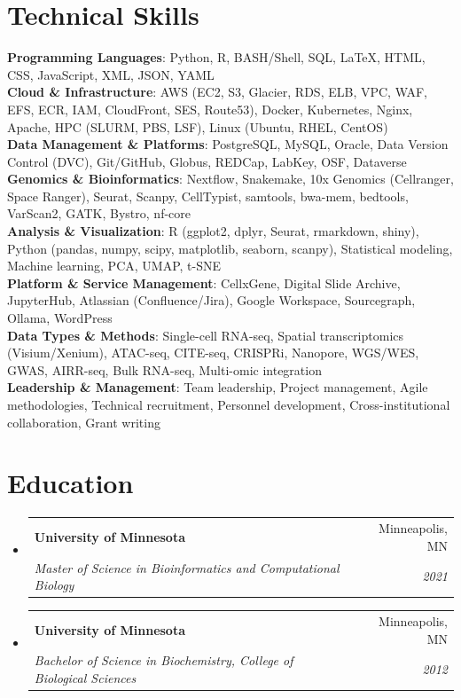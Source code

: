 \documentclass[letterpaper,11pt]{article}
\makeatletter
\newcommand{\resumeSubheading}[4]{
  \vspace{-2pt}\item
    \begin{tabular*}{0.97\textwidth}[t]{l@{\extracolsep{\fill}}r}
      \textbf{#1} & #2 \\
      \textit{\small#3} & \textit{\small #4} \\
    \end{tabular*}\vspace{-7pt}
}
\newcommand{\resumeSubHeadingListStart}{\begin{itemize}[leftmargin=0.15in, label={}]}
\newcommand{\resumeSubHeadingListEnd}{\end{itemize}}
\makeatother
\begin{document}
\section{Technical Skills}
 \begin{itemize}[leftmargin=0.15in, label={}]
    \small{\item{
     \textbf{Programming Languages}{: Python, R, BASH/Shell, SQL, LaTeX, HTML, CSS, JavaScript, XML, JSON, YAML} \\
     \textbf{Cloud \& Infrastructure}{: AWS (EC2, S3, Glacier, RDS, ELB, VPC, WAF, EFS, ECR, IAM, CloudFront, SES, Route53), Docker, Kubernetes, Nginx, Apache, HPC (SLURM, PBS, LSF), Linux (Ubuntu, RHEL, CentOS)} \\
     \textbf{Data Management \& Platforms}{: PostgreSQL, MySQL, Oracle, Data Version Control (DVC), Git/GitHub, Globus, REDCap, LabKey, OSF, Dataverse} \\
     \textbf{Genomics \& Bioinformatics}{: Nextflow, Snakemake, 10x Genomics (Cellranger, Space Ranger), Seurat, Scanpy, CellTypist, samtools, bwa-mem, bedtools, VarScan2, GATK, Bystro, nf-core} \\
     \textbf{Analysis \& Visualization}{: R (ggplot2, dplyr, Seurat, rmarkdown, shiny), Python (pandas, numpy, scipy, matplotlib, seaborn, scanpy), Statistical modeling, Machine learning, PCA, UMAP, t-SNE} \\
     \textbf{Platform \& Service Management}{: CellxGene, Digital Slide Archive, JupyterHub, Atlassian (Confluence/Jira), Google Workspace, Sourcegraph, Ollama, WordPress} \\
     \textbf{Data Types \& Methods}{: Single-cell RNA-seq, Spatial transcriptomics (Visium/Xenium), ATAC-seq, CITE-seq, CRISPRi, Nanopore, WGS/WES, GWAS, AIRR-seq, Bulk RNA-seq, Multi-omic integration} \\
     \textbf{Leadership \& Management}{: Team leadership, Project management, Agile methodologies, Technical recruitment, Personnel development, Cross-institutional collaboration, Grant writing}
    }}
 \end{itemize}

\section{Education}
  \resumeSubHeadingListStart
    \resumeSubheading
      {University of Minnesota}{Minneapolis, MN}
      {Master of Science in Bioinformatics and Computational Biology}{2021}
    \resumeSubheading
      {University of Minnesota}{Minneapolis, MN}
      {Bachelor of Science in Biochemistry, College of Biological Sciences}{2012}
  \resumeSubHeadingListEnd
\end{document}
